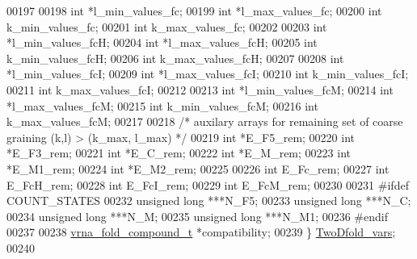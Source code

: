 \begin{DoxyCode}
00197 
00198   \textcolor{keywordtype}{int}             *l\_min\_values\_fc;
00199   \textcolor{keywordtype}{int}             *l\_max\_values\_fc;
00200   \textcolor{keywordtype}{int}             k\_min\_values\_fc;
00201   \textcolor{keywordtype}{int}             k\_max\_values\_fc;
00202 
00203   \textcolor{keywordtype}{int}             *l\_min\_values\_fcH;
00204   \textcolor{keywordtype}{int}             *l\_max\_values\_fcH;
00205   \textcolor{keywordtype}{int}             k\_min\_values\_fcH;
00206   \textcolor{keywordtype}{int}             k\_max\_values\_fcH;
00207 
00208   \textcolor{keywordtype}{int}             *l\_min\_values\_fcI;
00209   \textcolor{keywordtype}{int}             *l\_max\_values\_fcI;
00210   \textcolor{keywordtype}{int}             k\_min\_values\_fcI;
00211   \textcolor{keywordtype}{int}             k\_max\_values\_fcI;
00212 
00213   \textcolor{keywordtype}{int}             *l\_min\_values\_fcM;
00214   \textcolor{keywordtype}{int}             *l\_max\_values\_fcM;
00215   \textcolor{keywordtype}{int}             k\_min\_values\_fcM;
00216   \textcolor{keywordtype}{int}             k\_max\_values\_fcM;
00217 
00218   \textcolor{comment}{/* auxilary arrays for remaining set of coarse graining (k,l) > (k\_max, l\_max) */}
00219   \textcolor{keywordtype}{int}             *E\_F5\_rem;
00220   \textcolor{keywordtype}{int}             *E\_F3\_rem;
00221   \textcolor{keywordtype}{int}             *E\_C\_rem;
00222   \textcolor{keywordtype}{int}             *E\_M\_rem;
00223   \textcolor{keywordtype}{int}             *E\_M1\_rem;
00224   \textcolor{keywordtype}{int}             *E\_M2\_rem;
00225 
00226   \textcolor{keywordtype}{int}             E\_Fc\_rem;
00227   \textcolor{keywordtype}{int}             E\_FcH\_rem;
00228   \textcolor{keywordtype}{int}             E\_FcI\_rem;
00229   \textcolor{keywordtype}{int}             E\_FcM\_rem;
00230 
00231 \textcolor{preprocessor}{#ifdef COUNT\_STATES}
00232   \textcolor{keywordtype}{unsigned} \textcolor{keywordtype}{long}             ***N\_F5;
00233   \textcolor{keywordtype}{unsigned} \textcolor{keywordtype}{long}             ***N\_C;
00234   \textcolor{keywordtype}{unsigned} \textcolor{keywordtype}{long}             ***N\_M;
00235   \textcolor{keywordtype}{unsigned} \textcolor{keywordtype}{long}             ***N\_M1;
00236 \textcolor{preprocessor}{#endif}
00237 
00238   \mbox{\hyperlink{group__fold__compound_structvrna__fc__s}{vrna\_fold\_compound\_t}} *compatibility;
00239 \} \mbox{\hyperlink{group__kl__neighborhood__mfe_gaf4f514010a14f9d59d850742b3e96954}{TwoDfold\_vars}};
00240 

\end{DoxyCode}
